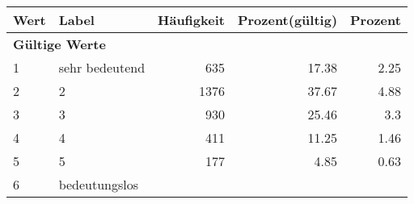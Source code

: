      \begin{longtable}{lXrrr}
     \toprule
     \textbf{Wert} & \textbf{Label} & \textbf{Häufigkeit} & \textbf{Prozent(gültig)} & \textbf{Prozent} \\
     \endhead
     \midrule
     \multicolumn{5}{l}{\textbf{Gültige Werte}}\\

     1 &
     \multicolumn{1}{X}{ sehr bedeutend   } &


       \num{635} &
       \num[round-mode=places,round-precision=2]{17.38} &
         \num[round-mode=places,round-precision=2]{2.25} \\

     2 &
     \multicolumn{1}{X}{ 2   } &


       \num{1376} &
       \num[round-mode=places,round-precision=2]{37.67} &
         \num[round-mode=places,round-precision=2]{4.88} \\

     3 &
     \multicolumn{1}{X}{ 3   } &


       \num{930} &
       \num[round-mode=places,round-precision=2]{25.46} &
         \num[round-mode=places,round-precision=2]{3.3} \\

     4 &
     \multicolumn{1}{X}{ 4   } &


       \num{411} &
       \num[round-mode=places,round-precision=2]{11.25} &
         \num[round-mode=places,round-precision=2]{1.46} \\

     5 &
     \multicolumn{1}{X}{ 5   } &


       \num{177} &
       \num[round-mode=places,round-precision=2]{4.85} &
         \num[round-mode=places,round-precision=2]{0.63} \\

     6 &
     \multicolumn{1}{X}{ bedeutungslos   } &



\end{longtable}
